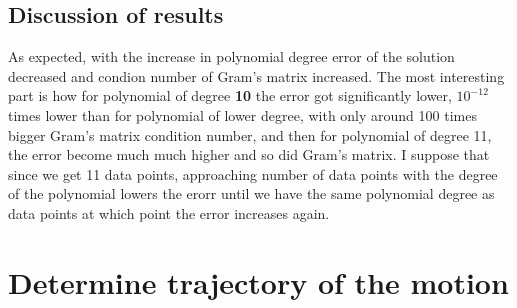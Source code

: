 \section{Discussion of results}
As expected, with the increase in polynomial degree error of the solution decreased and condion number of Gram's matrix increased. The most interesting part is how for polynomial of degree \textbf{10} the error got significantly lower, $10^{-12}$ times lower than for polynomial of lower degree, with only around 100 times bigger Gram's matrix condition number, and then for polynomial of degree 11, the error become much much higher and so did Gram's matrix. I suppose that since we get 11 data points, approaching number of data points with the degree of the polynomial lowers the erorr until we have the same polynomial degree as data points at which point the error increases again.






\chapter{Determine trajectory of the motion}


